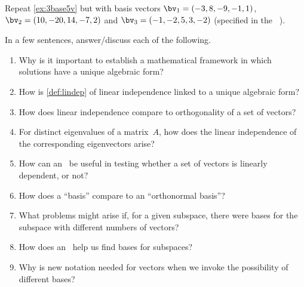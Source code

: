 \begin{exercise}  
Repeat \cref{ex:3base5v} but with basis vectors \(\bv_1=(-3,8,-9,-1,1)\), \(\bv_2=(10,-20,14,-7,2)\) and \(\bv_3=(-1,-2,5,3,-2)\) (specified in the ~\cE).
\setbox\ajrqrbox\hbox{}\marginajrbox%
\end{exercise}




\begin{exercise} 
In a few sentences, answer\slash discuss each of the following.
\begin{enumerate}
\item  Why is it important to establish a mathematical framework in which solutions have a unique algebraic form?

\item How is \cref{def:lindep} of linear independence linked to a unique algebraic form?

\item How does linear independence compare to orthogonality of a set of vectors?

\item For distinct eigenvalues of a matrix~\(A\), how does the linear independence of the corresponding eigenvectors arise?

\item How can an \svd\ be useful in testing whether a set of vectors is linearly dependent, or not?

\item How does a ``basis'' compare to an ``orthonormal basis''?

\item What problems might arise if, for a given subspace, there were bases for the subspace with different numbers of vectors?

\item How does an \svd\ help us find bases for subspaces?

\item Why is new notation needed for vectors when we invoke the possibility of different bases?

\end{enumerate}
\end{exercise}

\begin{comment}%
why, what caused X?
how did X occur?
what-if? what-if-not?
how does X compare with Y?
what is the evidence for X?
why is X important?
\end{comment}






